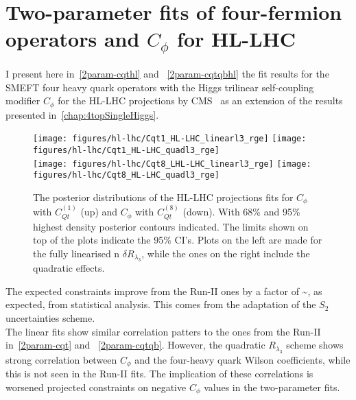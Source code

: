 \chapter{ Two-parameter fits of four-fermion operators and $C_\phi$ for HL-LHC}\label{sec:app4tops}
\label{app:due}
I present here in~\autoref{2param-cqthl} and ~\autoref{2param-cqtqbhl} the fit results for the SMEFT four heavy quark operators with the Higgs trilinear self-coupling modifier $C_\phi$ for the HL-LHC projections by CMS~\cite{CMS-PAS-FTR-18-011,twiki} as an extension of the results presented in~\autoref{chap:4topSingleHiggs}.\\
\begin{figure}[htpb!]
	\vspace{-0.7 cm}
\begin{center}
	\texttt{[image: figures/hl-lhc/Cqt1\_HL-LHC\_linearl3\_rge]}
	\texttt{[image: figures/hl-lhc/Cqt1\_HL-LHC\_quadl3\_rge]} \\ 
	\texttt{[image: figures/hl-lhc/Cqt8\_LHL-LHC\_linearl3\_rge]}
	\texttt{[image: figures/hl-lhc/Cqt8\_HL-LHC\_quadl3\_rge]} 
\end{center}
\caption{The posterior distributions of the HL-LHC projections fits for $C_\phi$ with $C_{Qt}^{(1)}$ (up) and $C_\phi$ with $C_{Qt}^{(8)}$ (down). With 68\% and 95\% highest density posterior contours indicated. The limits shown on top of the plots indicate the 95\% CI's. Plots on the left are made for the fully linearised n $\delta R_{\lambda_3}$, while the ones on the right include the quadratic effects.  \label{2param-cqthl}   }
\end{figure}
The expected constraints improve from the Run-II ones by a factor of 
\be
 \sim{},
\ee
as expected, from statistical analysis. This comes from the adaptation of the $S_2$ uncertainties scheme.  \\ The linear fits show similar correlation patters to the ones from the Run-II in~\autoref{2param-cqt} and ~\autoref{2param-cqtqb}. However, the quadratic $R_{\lambda_3}$ scheme shows strong correlation between $C_\phi$ and the four-heavy quark Wilson coefficients, while this is not seen in the Run-II fits. The implication of these correlations is worsened projected constraints on negative $C_\phi$ values in the two-parameter fits. 
